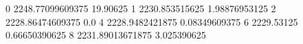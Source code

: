 0 2248.77099609375 19.90625
1 2230.853515625 1.98876953125
2 2228.86474609375 0.0
4 2228.9482421875 0.08349609375
6 2229.53125 0.66650390625
8 2231.89013671875 3.025390625
